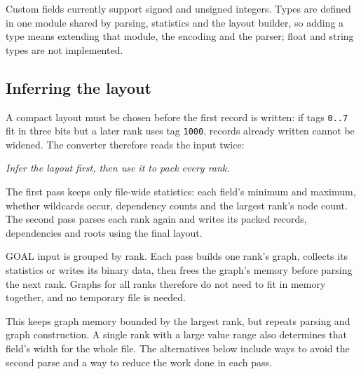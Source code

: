 \documentclass[10pt,a4paper]{article}
\begin{document}
Custom fields currently support signed and unsigned integers. Types are defined in one module shared by parsing, statistics and the layout builder, so adding a type means extending that module, the encoding and the parser; float and string types are not implemented.

\hypertarget{inferring-the-layout}{}
\subsection{Inferring the layout}

A compact layout must be chosen before the first record is written: if tags \texttt{0.\allowbreak{}.\allowbreak{}7} fit in three bits but a later rank uses tag \texttt{1000}, records already written cannot be widened. The converter therefore reads the input twice:

\begin{center}
\resizebox{\linewidth}{!}{}
\par\nopagebreak\small\itshape Infer the layout first, then use it to pack every rank.
\end{center}

The first pass keeps only file-wide statistics: each field's minimum and maximum, whether wildcards occur, dependency counts and the largest rank's node count. The second pass parses each rank again and writes its packed records, dependencies and roots using the final layout.

GOAL input is grouped by rank. Each pass builds one rank's graph, collects its statistics or writes its binary data, then frees the graph's memory before parsing the next rank. Graphs for all ranks therefore do not need to fit in memory together, and no temporary file is needed.

This keeps graph memory bounded by the largest rank, but repeats parsing and graph construction. A single rank with a large value range also determines that field's width for the whole file. The alternatives below include ways to avoid the second parse and a way to reduce the work done in each pass.
\end{document}
